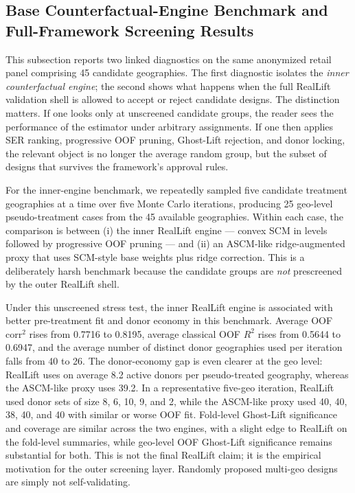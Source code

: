 \documentclass[11pt]{article}
\begin{document}
\subsection{Base Counterfactual-Engine Benchmark and Full-Framework Screening Results}
This subsection reports two linked diagnostics on the same anonymized retail panel comprising 45 candidate geographies. The first diagnostic isolates the \emph{inner counterfactual engine}; the second shows what happens when the full RealLift validation shell is allowed to accept or reject candidate designs. The distinction matters. If one looks only at unscreened candidate groups, the reader sees the performance of the estimator under arbitrary assignments. If one then applies SER ranking, progressive OOF pruning, Ghost-Lift rejection, and donor locking, the relevant object is no longer the average random group, but the subset of designs that survives the framework's approval rules.

For the inner-engine benchmark, we repeatedly sampled five candidate treatment geographies at a time over five Monte Carlo iterations, producing 25 geo-level pseudo-treatment cases from the 45 available geographies. Within each case, the comparison is between (i) the inner RealLift engine --- convex SCM in levels followed by progressive OOF pruning --- and (ii) an ASCM-like ridge-augmented proxy that uses SCM-style base weights plus ridge correction. This is a deliberately harsh benchmark because the candidate groups are \emph{not} prescreened by the outer RealLift shell.

Under this unscreened stress test, the inner RealLift engine is associated with better pre-treatment fit and donor economy in this benchmark. Average OOF corr$^2$ rises from 0.7716 to 0.8195, average classical OOF $R^2$ rises from 0.5644 to 0.6947, and the average number of distinct donor geographies used per iteration falls from 40 to 26. The donor-economy gap is even clearer at the geo level: RealLift uses on average 8.2 active donors per pseudo-treated geography, whereas the ASCM-like proxy uses 39.2. In a representative five-geo iteration, RealLift used donor sets of size 8, 6, 10, 9, and 2, while the ASCM-like proxy used 40, 40, 38, 40, and 40 with similar or worse OOF fit. Fold-level Ghost-Lift significance and coverage are similar across the two engines, with a slight edge to RealLift on the fold-level summaries, while geo-level OOF Ghost-Lift significance remains substantial for both. This is not the final RealLift claim; it is the empirical motivation for the outer screening layer. Randomly proposed multi-geo designs are simply not self-validating.
\end{document}

